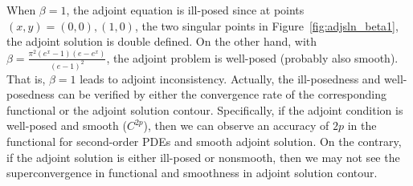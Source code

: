 \documentclass[a4paper]{article}
\begin{document}
When $\beta=1$, the adjoint equation is ill-posed since at points $(x,y)=(0,0), (1,0)$, the two singular points in Figure~\ref*{fig:adjsln_beta1}, the adjoint solution is double defined. On the other hand, with $\beta=\frac{\pi^2(e^x-1)(e-e^x)}{(e-1)^2}$, the adjoint problem is well-posed (probably also smooth). That is, $\beta=1$ leads to adjoint inconsistency. Actually, the ill-posedness and well-posedness can be verified by either the convergence rate of the corresponding functional or the adjoint solution contour. Specifically, if the adjoint condition is well-posed and smooth ($C^{2p}$), then we can observe an accuracy of $2p$ in the functional for second-order PDEs\cite{Hicken2011} and smooth adjoint solution. On the contrary, if the adjoint solution is either ill-posed or nonsmooth, then we may not see the superconvergence in functional and smoothness in adjoint solution contour. 




\end{document}
